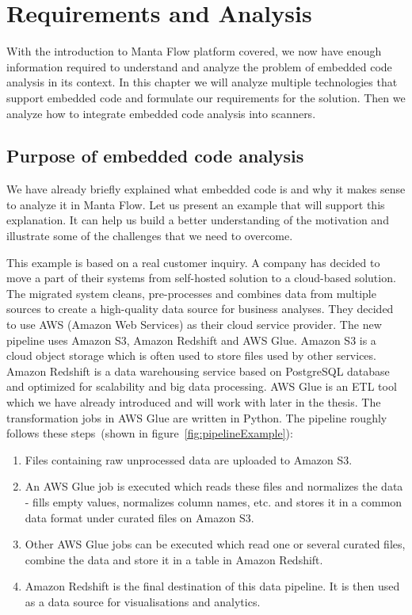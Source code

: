  \chapter{Requirements and Analysis}

With the introduction to Manta Flow platform covered, we now have enough information required to understand and analyze the problem of embedded code analysis in its context. In this chapter we will analyze multiple technologies that support embedded code and formulate our requirements for the solution. Then we analyze how to integrate embedded code analysis into scanners. %

\section{Purpose of embedded code analysis}

We have already briefly explained what embedded code is and why it makes sense to analyze it in Manta Flow. Let us present an example that will support this explanation. It can help us build a better understanding of the motivation and illustrate some of the challenges that we need to overcome.
\par
This example is based on a real customer inquiry. A company has decided to move a part of their systems from self-hosted solution to a cloud-based solution. The migrated system cleans, pre-processes and combines data from multiple sources to create a high-quality data source for business analyses. They decided to use AWS (Amazon Web Services) as their cloud service provider. The new pipeline uses Amazon S3, Amazon Redshift and AWS Glue. Amazon S3 is a cloud object storage which is often used to store files used by other services. Amazon Redshift is a data warehousing service based on PostgreSQL database and optimized for scalability and big data processing. AWS Glue is an ETL tool which we have already introduced and will work with later in the thesis. The transformation jobs in AWS Glue are written in Python. The pipeline roughly follows these steps~(shown in figure~\ref{fig:pipelineExample}):
\begin{enumerate}
    \item Files containing raw unprocessed data are uploaded to Amazon S3.
    \item An AWS Glue job is executed which reads these files and normalizes the data - fills empty values, normalizes column names, etc. and stores it in a common data format under curated files on Amazon S3.
    \item Other AWS Glue jobs can be executed which read one or several curated files, combine the data and store it in a table in Amazon Redshift.
    \item Amazon Redshift is the final destination of this data pipeline. It is then used as a data source for visualisations and analytics.
\end{enumerate}

